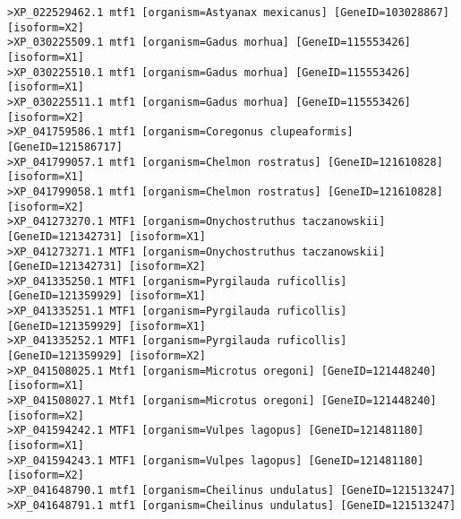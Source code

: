 \begin{lstlisting}[basicstyle=\tiny\ttfamily]
>XP_022529462.1 mtf1 [organism=Astyanax mexicanus] [GeneID=103028867] [isoform=X2]
>XP_030225509.1 mtf1 [organism=Gadus morhua] [GeneID=115553426] [isoform=X1]
>XP_030225510.1 mtf1 [organism=Gadus morhua] [GeneID=115553426] [isoform=X1]
>XP_030225511.1 mtf1 [organism=Gadus morhua] [GeneID=115553426] [isoform=X2]
>XP_041759586.1 mtf1 [organism=Coregonus clupeaformis] [GeneID=121586717]
>XP_041799057.1 mtf1 [organism=Chelmon rostratus] [GeneID=121610828] [isoform=X1]
>XP_041799058.1 mtf1 [organism=Chelmon rostratus] [GeneID=121610828] [isoform=X2]
>XP_041273270.1 MTF1 [organism=Onychostruthus taczanowskii] [GeneID=121342731] [isoform=X1]
>XP_041273271.1 MTF1 [organism=Onychostruthus taczanowskii] [GeneID=121342731] [isoform=X2]
>XP_041335250.1 MTF1 [organism=Pyrgilauda ruficollis] [GeneID=121359929] [isoform=X1]
>XP_041335251.1 MTF1 [organism=Pyrgilauda ruficollis] [GeneID=121359929] [isoform=X1]
>XP_041335252.1 MTF1 [organism=Pyrgilauda ruficollis] [GeneID=121359929] [isoform=X2]
>XP_041508025.1 Mtf1 [organism=Microtus oregoni] [GeneID=121448240] [isoform=X1]
>XP_041508027.1 Mtf1 [organism=Microtus oregoni] [GeneID=121448240] [isoform=X2]
>XP_041594242.1 MTF1 [organism=Vulpes lagopus] [GeneID=121481180] [isoform=X1]
>XP_041594243.1 MTF1 [organism=Vulpes lagopus] [GeneID=121481180] [isoform=X2]
>XP_041648790.1 mtf1 [organism=Cheilinus undulatus] [GeneID=121513247]
>XP_041648791.1 mtf1 [organism=Cheilinus undulatus] [GeneID=121513247]


\end{lstlisting}
